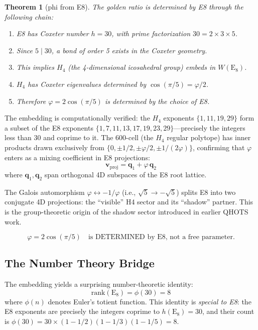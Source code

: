 \documentclass[aps,prd,twocolumn,superscriptaddress,floatfix,nofootinbib]{revtex4-2}
\newtheorem{theorem}{Theorem}
\theoremstyle{definition}
\theoremstyle{remark}
\newcommand{\vp}{\varphi}
\begin{document}
\begin{theorem}[phi from E8]
The golden ratio is determined by E8 through the following chain:
\begin{enumerate}
    \item E8 has Coxeter number $h = 30$, with prime factorization $30 = 2 \times 3 \times 5$.
    \item Since $5 \mid 30$, a bond of order 5 exists in the Coxeter geometry.
    \item This implies $H_4$ (the 4-dimensional icosahedral group) embeds in $W(\text{E}_8)$.
    \item $H_4$ has Coxeter eigenvalues determined by $\cos(\pi/5) = \vp/2$.
    \item Therefore $\vp = 2\cos(\pi/5)$ is determined by the choice of E8.
\end{enumerate}
\end{theorem}

\noindent
The embedding is computationally verified: the $H_4$ exponents $\{1, 11, 19, 29\}$
form a subset of the E8 exponents $\{1, 7, 11, 13, 17, 19, 23, 29\}$---precisely
the integers less than 30 and coprime to it. The 600-cell (the $H_4$ regular polytope)
has inner products drawn exclusively from $\{0, \pm 1/2, \pm \vp/2, \pm 1/(2\vp)\}$,
confirming that $\vp$ enters as a mixing coefficient in E8 projections:
\begin{equation}
    \mathbf{v}_{\text{proj}} = \mathbf{q}_1 + \vp \, \mathbf{q}_2
\end{equation}
where $\mathbf{q}_1, \mathbf{q}_2$ span orthogonal 4D subspaces of the E8 root lattice.

The Galois automorphism $\vp \leftrightarrow -1/\vp$ (i.e., $\sqrt{5} \to -\sqrt{5}$)
splits E8 into two conjugate 4D projections: the ``visible'' H4 sector and its
``shadow'' partner. This is the group-theoretic origin of the shadow sector
introduced in earlier QHOTS work.

\begin{equation}
    \boxed{\vp = 2\cos(\pi/5) \quad \text{is DETERMINED by E8, not a free parameter.}}
\end{equation}

\subsection{The Number Theory Bridge}

The embedding yields a surprising number-theoretic identity:
\begin{equation}
    \boxed{\text{rank}(\text{E}_8) = \phi(30) = 8}
\end{equation}
where $\phi(n)$ denotes Euler's totient function. This identity is \emph{special to E8}:
the E8 exponents are precisely the integers coprime to $h(\text{E}_8) = 30$, and their
count is $\phi(30) = 30 \times (1 - 1/2)(1 - 1/3)(1 - 1/5) = 8$.
\end{document}
